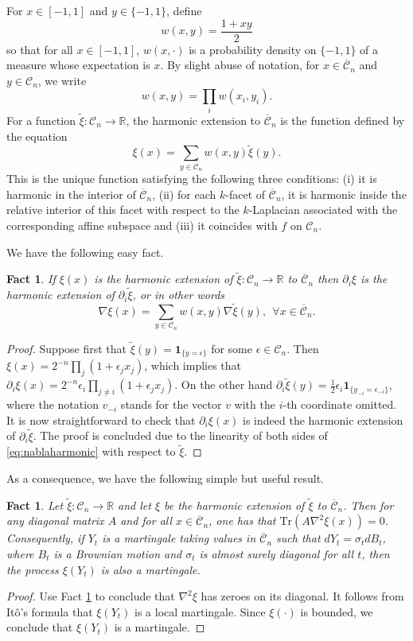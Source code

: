 \documentclass[12pt]{article}
\def \RR {\mathbb R}
\def \CC {\mathbb C}
\def \tr {\mathrm{Tr}}
\def \DC {\mathcal{C}_n}
\def \CC {\overline{\mathcal{C}}_n}
\newtheorem{fact}[theorem]{Fact}
\theoremstyle{definition}
\theoremstyle{remark}
\begin{document}
For $x \in [-1,1]$ and $y \in \{-1,1\}$, define
$$
w(x,y) = \frac{1+xy}{2}
$$
so that for all $x \in [-1,1]$, $w(x, \cdot)$ is a probability density on $\{-1,1\}$ of a measure whose expectation is $x$. By slight abuse of notation, for $x \in \CC$ and $y \in \DC$, we write
$$
w(x,y) = \prod_i w(x_i, y_i).
$$
For a function $\tilde \xi:\DC \to \RR$, the harmonic extension to $\CC$ is the function defined by the equation
$$
\xi(x) = \sum_{y \in \DC} w(x,y) \tilde \xi(y).
$$
This is the unique function satisfying the following three conditions: (i) it is harmonic in the interior of $\CC$, (ii) for each $k$-facet of $\CC$, it is harmonic inside the relative interior of this facet with respect to the $k$-Laplacian associated with the corresponding affine subspace and (iii) it coincides with $f$ on $\DC$.

We have the following easy fact.
\begin{fact} \label{fact:harmonicext}
	If $\xi(x)$ is the harmonic extension of $\tilde \xi : \DC \to \RR$ to $\CC$ then $\partial_i \xi$ is the harmonic extension of $\partial_i \tilde \xi$, or in other words
	\begin{equation}\label{eq:nablaharmonic}
	\nabla  \xi (x) = \sum_{y \in \DC} w(x,y) \nabla \tilde \xi(y), ~~ \forall x \in \CC.
	\end{equation}
\end{fact}
\begin{proof}
	Suppose first that $\tilde \xi (y) = \mathbf{1}_{ \{ y = \epsilon\} }$	for some $\epsilon \in \DC$. Then $\xi(x) = 2^{-n} \prod_j (1 + \epsilon_j x_j)$, which implies that $\partial_i \xi(x) = 2^{-n} \epsilon_i \prod_{j \neq i} (1 + \epsilon_j x_j)$. On the other hand $\partial_i \tilde \xi(y) = \tfrac{1}{2} \epsilon_i \mathbf{1}_{ \{ y_{-i} = \epsilon_{-i} \}}$, where the notation $v_{-i}$ stands for the vector $v$ with the $i$-th coordinate omitted. It is now straightforward to check that $\partial_i \xi(x)$ is indeed the harmonic extension of $\partial_i \tilde \xi$. The proof is concluded due to the linearity of both sides of \eqref{eq:nablaharmonic} with respect to $\tilde \xi$.
\end{proof}
As a consequence, we have the following simple but useful result.
\begin{fact} \label{fact:extmartingale}
	Let $\tilde \xi: \DC \to \RR$ and let $\xi$ be the harmonic extension of $\tilde \xi$ to $\CC$. Then for any diagonal matrix $A$ and for all $x \in \CC$, one has that $\tr(A \nabla^2 \xi(x)) = 0$. Consequently, if $Y_t$ is a martingale taking values in $\CC$ such that $d Y_t = \sigma_t d B_t$, where $B_t$ is a Brownian motion and $\sigma_t$ is almost surely diagonal for all $t$, then the process $\xi(Y_t)$ is also a martingale.
\end{fact}
\begin{proof} Use Fact \ref{fact:harmonicext} to conclude that $\nabla^2 \xi$ has zeroes on its diagonal. It follows from It\^{o}'s formula that $\xi(Y_t)$ is a local martingale. Since $\xi(\cdot)$ is bounded, we conclude that $\xi(Y_t)$ is a martingale.
\end{proof}
\end{document}
